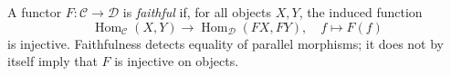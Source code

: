 
A functor $F:\mathcal C\to\mathcal D$ is \emph{faithful} if, for all objects $X,Y$, the induced function
\[
\operatorname{Hom}_{\mathcal C}(X,Y)\to\operatorname{Hom}_{\mathcal D}(F X,F Y),\quad f\mapsto F(f)
\]
is injective. Faithfulness detects equality of parallel morphisms; it does not by itself imply that $F$ is injective on objects.
